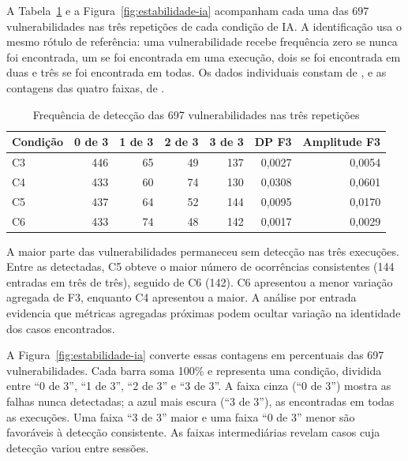 A Tabela~\ref{tab:estabilidade-resultados} e a Figura~\ref{fig:estabilidade-ia}
acompanham cada uma das 697 vulnerabilidades nas três repetições de cada
condição de IA. A identificação usa o mesmo rótulo de referência: uma
vulnerabilidade recebe frequência zero se nunca foi encontrada, um se foi
encontrada em uma execução, dois se foi encontrada em duas e três se foi
encontrada em todas. Os dados individuais constam de
, e as contagens das
quatro faixas, de .

\begin{table}[htb]
\ABNTEXfontereduzida
\caption{\label{tab:estabilidade-resultados}Frequência de detecção das 697 vulnerabilidades nas três repetições}
\centering
\begin{tabular}{lrrrrrr}
\hline
\textbf{Condição} & \textbf{0 de 3} & \textbf{1 de 3} & \textbf{2 de 3} &
\textbf{3 de 3} & \textbf{DP F3} & \textbf{Amplitude F3} \\
\hline
C3 & 446 & 65 & 49 & 137 & 0,0027 & 0,0054 \\
C4 & 433 & 60 & 74 & 130 & 0,0308 & 0,0601 \\
C5 & 437 & 64 & 52 & 144 & 0,0095 & 0,0170 \\
C6 & 433 & 74 & 48 & 142 & 0,0017 & 0,0029 \\
\hline
\end{tabular}
\end{table}

A maior parte das vulnerabilidades permaneceu sem detecção nas três execuções.
Entre as detectadas, C5 obteve o maior número de ocorrências consistentes
(144 entradas em três de três), seguido de C6 (142). C6 apresentou a menor
variação agregada de F3, enquanto C4 apresentou a maior. A análise por entrada
evidencia que métricas agregadas próximas podem ocultar variação na identidade
dos casos encontrados.

A Figura~\ref{fig:estabilidade-ia} converte essas contagens em percentuais
das 697 vulnerabilidades. Cada barra soma 100\% e representa uma condição,
dividida entre ``0 de 3'', ``1 de 3'', ``2 de 3'' e ``3 de 3''. A faixa cinza
(``0 de 3'') mostra as falhas nunca detectadas; a azul mais escura
(``3 de 3''), as encontradas em todas as execuções. Uma faixa ``3 de 3''
maior e uma faixa ``0 de 3'' menor são favoráveis à detecção consistente.
As faixas intermediárias revelam casos cuja detecção variou entre sessões.

